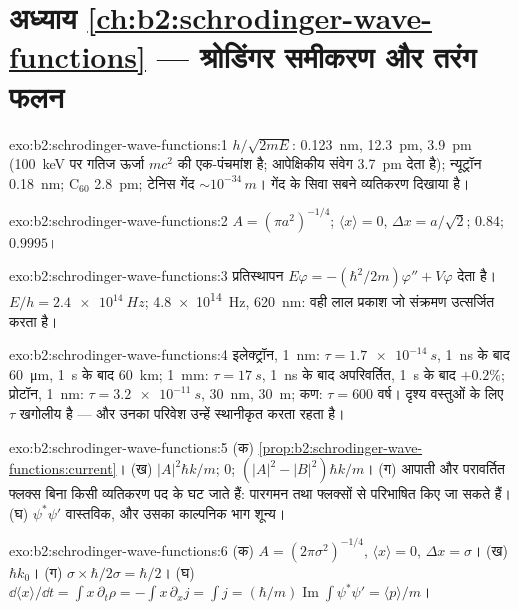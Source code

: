 \section*{अध्याय \ref{ch:b2:schrodinger-wave-functions} --- श्रोडिंगर समीकरण और तरंग फलन}

\begin{solution}{exo:b2:schrodinger-wave-functions:1}
$h/\sqrt{2mE}$: \qty{0.123}{nm}, \qty{12.3}{pm}, \qty{3.9}{pm} (\qty{100}{keV} पर
गतिज ऊर्जा $mc^2$ की एक-पंचमांश है; आपेक्षिकीय संवेग
\qty{3.7}{pm} देता है); न्यूट्रॉन \qty{0.18}{nm}; C$_{60}$ \qty{2.8}{pm}; टेनिस गेंद
$\sim 10^{-34}\,\unit{m}$। गेंद के सिवा सबने व्यतिकरण दिखाया है।
\end{solution}

\begin{solution}{exo:b2:schrodinger-wave-functions:2}
$A = (\pi a^2)^{-1/4}$; $\langle x\rangle = 0$, $\Delta x = a/\sqrt2$; $0.84$; $0.9995$।
\end{solution}

\begin{solution}{exo:b2:schrodinger-wave-functions:3}
प्रतिस्थापन $E\varphi = -(\hbar^2/2m)\varphi'' + V\varphi$ देता है। $E/h =
\qty{2.4e14}{Hz}$; \qty{4.8e14}{Hz}, \qty{620}{nm}: वही लाल प्रकाश जो संक्रमण
उत्सर्जित करता है।
\end{solution}

\begin{solution}{exo:b2:schrodinger-wave-functions:4}
इलेक्ट्रॉन, \qty{1}{nm}: $\tau = \qty{1.7e-14}{s}$, \qty{1}{ns} के बाद \qty{60}{\micro m},
\qty{1}{s} के बाद \qty{60}{km}; \qty{1}{mm}: $\tau = \qty{17}{s}$, \qty{1}{ns} के बाद अपरिवर्तित,
\qty{1}{s} के बाद $+0.2\%$; प्रोटॉन, \qty{1}{nm}: $\tau = \qty{3.2e-11}{s}$, \qty{30}{nm},
\qty{30}{m}; कण: $\tau = 600$ वर्ष। दृश्य वस्तुओं के लिए $\tau$
खगोलीय है --- और उनका परिवेश उन्हें स्थानीकृत करता रहता है।
\end{solution}

\begin{solution}{exo:b2:schrodinger-wave-functions:5}
(क) \cref{prop:b2:schrodinger-wave-functions:current}। (ख) $|A|^2\hbar k/m$;
$0$; $(|A|^2 - |B|^2)\hbar k/m$। (ग) आपाती और परावर्तित फ्लक्स
बिना किसी व्यतिकरण पद के घट जाते हैं: पारगमन तथा  फ्लक्सों से परिभाषित किए जा सकते हैं। (घ) $\psi^*\psi'$ वास्तविक, और उसका
काल्पनिक भाग शून्य।
\end{solution}

\begin{solution}{exo:b2:schrodinger-wave-functions:6}
(क) $A = (2\pi\sigma^2)^{-1/4}$, $\langle x\rangle = 0$, $\Delta x = \sigma$। (ख) $\hbar k_0$।
(ग) $\sigma \times \hbar/2\sigma = \hbar/2$। (घ) $\dd\langle x\rangle/\dd t = \int x\,
\partial_t\rho = -\int x\,\partial_xj = \int j = (\hbar/m)\operatorname{Im}\int\psi^*
\psi' = \langle p\rangle/m$।
\end{solution}


